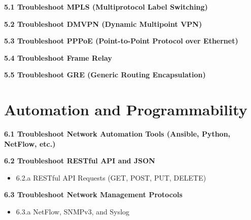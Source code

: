 \documentclass{article}
\begin{document}
\noindent\textbf{5.1 Troubleshoot MPLS (Multiprotocol Label Switching)}

\noindent\textbf{5.2 Troubleshoot DMVPN (Dynamic Multipoint VPN)}

\noindent\textbf{5.3 Troubleshoot PPPoE (Point-to-Point Protocol over Ethernet)}

\noindent\textbf{5.4 Troubleshoot Frame Relay}

\noindent\textbf{5.5 Troubleshoot GRE (Generic Routing Encapsulation)}

\section{Automation and Programmability}

\noindent\textbf{6.1 Troubleshoot Network Automation Tools (Ansible, Python, NetFlow, etc.)}

\noindent\textbf{6.2 Troubleshoot RESTful API and JSON}
\begin{itemize}
    \item 6.2.a RESTful API Requests (GET, POST, PUT, DELETE)
\end{itemize}

\noindent\textbf{6.3 Troubleshoot Network Management Protocols}
\begin{itemize}
    \item 6.3.a NetFlow, SNMPv3, and Syslog
\end{itemize}
\end{document}
